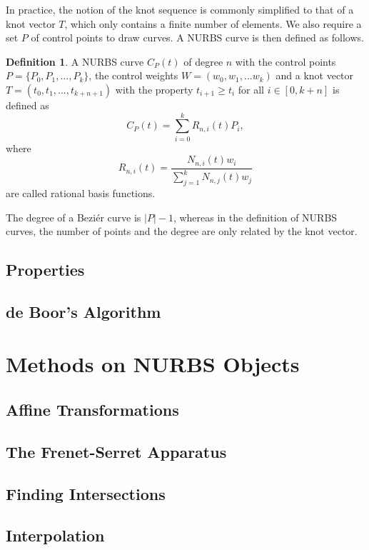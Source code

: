 \documentclass[a4paper, 11pt]{report}
\theoremstyle{definition}
\newtheorem{definition}{Definition}[section]
\begin{document}
In practice, the notion of the knot sequence is commonly simplified to that of a knot vector $T$, which only contains a finite number of elements. We also require a set $P$ of control points to draw curves. A NURBS curve is then defined as follows.

\begin{definition}
	A NURBS curve $C_P(t)$ of degree $n$ with the control points $P = \{P_0, P_1, ..., P_k\}$, the control weights $W = (w_0, w_1, ... w_k)$ and a knot vector $T = (t_0, t_1, ..., t_{k+n+1})$ with the property $t_{i+1} \geq t_{i}$ for all $i \in [0, k+n]$ is defined as
	\begin{equation}
		C_P(t) = \sum_{i=0}^k R_{n,i}(t)P_i,
	\end{equation}
	where
	\begin{equation}
		R_{n,i}(t) = \frac{N_{n,i}(t)w_i}{\sum_{j=1}^k N_{n,j}(t) w_j}
	\end{equation}
	are called rational basis functions.
\end{definition}

The degree of a Beziér curve is $|P|-1$, whereas in the definition of NURBS curves, the number of points and the degree are only related by the knot vector.

\subsection{Properties}
\subsection{de Boor's Algorithm}

\section{Methods on NURBS Objects}
\subsection{Affine Transformations}
\subsection{The Frenet-Serret Apparatus}
\subsection{Finding Intersections}
\subsection{Interpolation}
\end{document}
